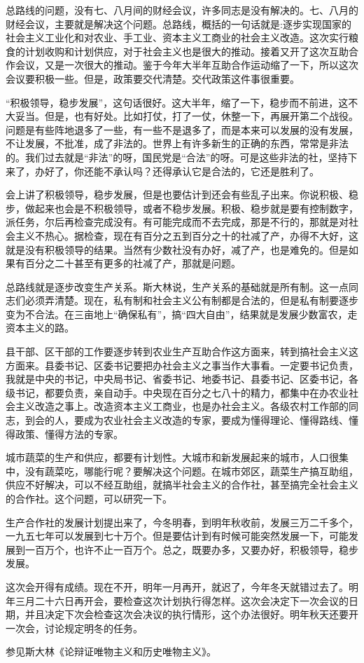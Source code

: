 总路线的问题，没有七、八月间的财经会议，许多同志是没有解决的。七、八月的财经会议，主要就是解决这个问题。总路线，概括的一句话就是:逐步实现国家的社会主义工业化和对农业、手工业、资本主义工商业的社会主义改造。这次实行粮食的计划收购和计划供应，对于社会主义也是很大的推动。接着又开了这次互助合作会议，又是一次很大的推动。鉴于今年大半年互助合作运动缩了一下，所以这次会议要积极一些。但是，政策要交代清楚。交代政策这件事很重要。

“积极领导，稳步发展”，这句话很好。这大半年，缩了一下，稳步而不前进，这不大妥当。但是，也有好处。比如打仗，打了一仗，休整一下，再展开第二个战役。问题是有些阵地退多了一些，有一些不是退多了，而是本来可以发展的没有发展，不让发展，不批准，成了非法的。世界上有许多新生的正确的东西，常常是非法的。我们过去就是“非法”的呀，国民党是“合法”的呀。可是这些非法的社，坚持下来了，办好了，你还能不承认吗？还得承认它是合法的，它还是胜利了。

会上讲了积极领导，稳步发展，但是也要估计到还会有些乱子出来。你说积极、稳步，做起来也会是不积极领导，或者不稳步发展。积极、稳步就是要有控制数字，派任务，尔后再检查完成没有。有可能完成而不去完成，那是不行的，那就是对社会主义不热心。据检查，现在有百分之五到百分之十的社减了产，办得不大好，这就是没有积极领导的结果。当然有少数社没有办好，减了产，也是难免的。但是如果有百分之二十甚至有更多的社减了产，那就是问题。

总路线就是逐步改变生产关系。斯大林说，生产关系的基础就是所有制。这一点同志们必须弄清楚。现在，私有制和社会主义公有制都是合法的，但是私有制要逐步变为不合法。在三亩地上“确保私有”，搞“四大自由”，结果就是发展少数富农，走资本主义的路。

县干部、区干部的工作要逐步转到农业生产互助合作这方面来，转到搞社会主义这方面来。县委书记、区委书记要把办社会主义之事当作大事看。一定要书记负责，我就是中央的书记，中央局书记、省委书记、地委书记、县委书记、区委书记，各级书记，都要负责，亲自动手。中央现在百分之七八十的精力，都集中在办农业社会主义改造之事上。改造资本主义工商业，也是办社会主义。各级农村工作部的同志，到会的人，要成为农业社会主义改造的专家，要成为懂得理论、懂得路线、懂得政策、懂得方法的专家。

城市蔬菜的生产和供应，都要有计划性。大城市和新发展起来的城市，人口很集中，没有蔬菜吃，哪能行呢？要解决这个问题。在城市郊区，蔬菜生产搞互助组，供应不好解决，可以不经互助组，就搞半社会主义的合作社，甚至搞完全社会主义的合作社。这个问题，可以研究一下。

生产合作社的发展计划提出来了，今冬明春，到明年秋收前，发展三万二千多个，一九五七年可以发展到七十万个。但是要估计到有时候可能突然发展一下，可能发展到一百万个，也许不止一百万个。总之，既要办多，又要办好，积极领导，稳步发展。

这次会开得有成绩。现在不开，明年一月再开，就迟了，今年冬天就错过去了。明年三月二十六日再开会，要检查这次计划执行得怎样。这次会决定下一次会议的日期，并且决定下次会检查这次会决议的执行情形，这个办法很好。明年秋天还要开一次会，讨论规定明冬的任务。


\begin{maonote}
参见斯大林《论辩证唯物主义和历史唯物主义》。
\end{maonote}
